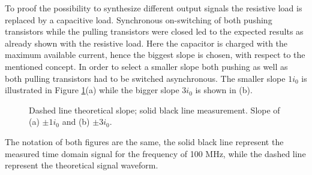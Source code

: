 \documentclass[journal]{IEEEtran}
\begin{document}
To proof the possibility to synthesize different output signals the resistive load is replaced by a capacitive load.
Synchronous on-switching of both pushing transistors while the pulling transistors were closed led to the expected results as already shown with the resistive load.
Here the capacitor is charged with the maximum available current, hence the biggest slope is chosen, with respect to the mentioned concept.
In order to select a smaller slope both pushing as well as both pulling transistors had to be switched asynchronous.
The smaller slope $1 i_0$ is illustrated in Figure \ref{fig:meas_Output_CLoad_100M_1io_3io}(a) while the bigger slope $3 i_0$ is shown in (b).

%
\begin{figure}[htb]
  \centering
	\begin{scriptsize}
  	\def\svgwidth{\columnwidth}
 	 
  	\caption{Dashed line theoretical slope; solid black line measurement. Slope of (a) $\pm 1  i_0$ and (b) $\pm 3 i_0$.}
  	\label{fig:meas_Output_CLoad_100M_1io_3io}
	\end{scriptsize}
\end{figure}

The notation of both figures are the same, the solid black line represent the measured time domain signal for the frequency of 100 MHz, while the dashed line represent the theoretical signal waveform.

\end{document}
